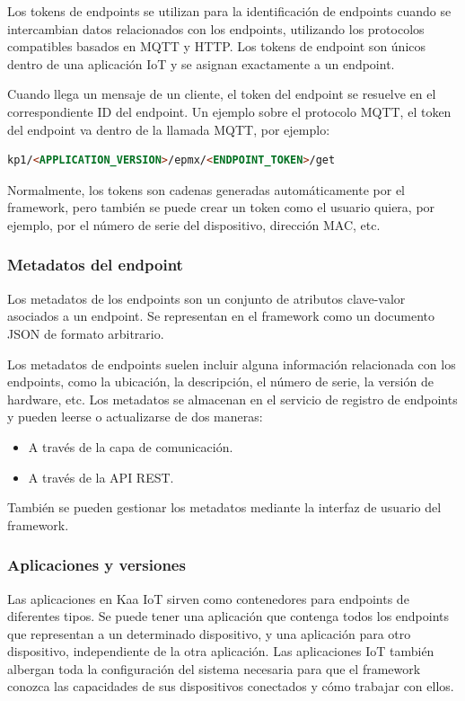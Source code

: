Los tokens de endpoints se utilizan para la identificación de endpoints cuando se intercambian datos relacionados con los endpoints, utilizando los protocolos compatibles basados en MQTT y HTTP. Los tokens de endpoint son únicos dentro de una aplicación IoT y se asignan exactamente a un endpoint.

Cuando llega un mensaje de un cliente, el token del endpoint se resuelve en el correspondiente ID del endpoint. Un ejemplo sobre el protocolo MQTT, el token del endpoint va dentro de la llamada MQTT, por ejemplo:

\begin{lstlisting}[language=HTML]
kp1/<APPLICATION_VERSION>/epmx/<ENDPOINT_TOKEN>/get
\end{lstlisting}

Normalmente, los tokens son cadenas generadas automáticamente por el framework, pero también se puede crear un token como el usuario quiera, por ejemplo, por el número de serie del dispositivo, dirección MAC, etc.

\subsubsection{Metadatos del endpoint}

Los metadatos de los endpoints son un conjunto de atributos clave-valor asociados a un endpoint. Se representan en el framework como un documento JSON de formato arbitrario.

Los metadatos de endpoints suelen incluir alguna información relacionada con los endpoints, como la ubicación, la descripción, el número de serie, la versión de hardware, etc. Los metadatos se almacenan en el servicio de registro de endpoints y pueden leerse o actualizarse de dos maneras:

\begin{itemize}
    \item A través de la capa de comunicación.
    \item A través de la API REST.
\end{itemize}

También se pueden gestionar los metadatos mediante la interfaz de usuario del framework.

\subsubsection{Aplicaciones y versiones}

Las aplicaciones en Kaa IoT sirven como contenedores para endpoints de diferentes tipos. Se puede tener una aplicación que contenga todos los endpoints que representan a un determinado dispositivo, y una aplicación para otro dispositivo, independiente de la otra aplicación. Las aplicaciones IoT también albergan toda la configuración del sistema necesaria para que el framework conozca las capacidades de sus dispositivos conectados y cómo trabajar con ellos.

